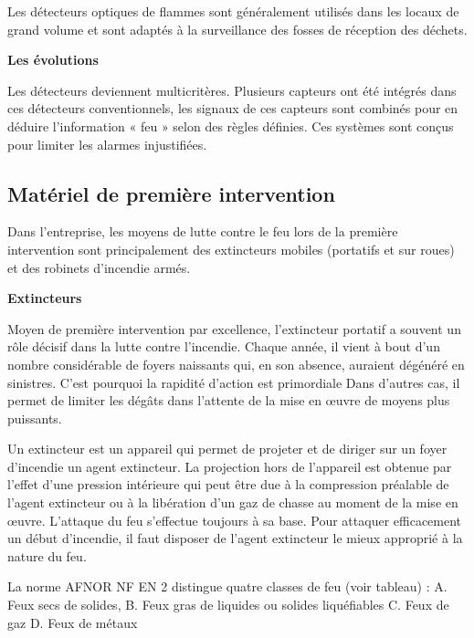 Les détecteurs optiques de flammes sont généralement utilisés dans les locaux de grand volume et sont adaptés à la surveillance des fosses de réception des déchets.


\vspace{0.3cm}
\textbf{Les évolutions}
\vspace{0.3cm} 

Les détecteurs deviennent multicritères. Plusieurs capteurs ont été intégrés dans ces détecteurs conventionnels, les signaux de ces capteurs sont combinés pour en déduire l’information « feu » selon des règles définies. Ces systèmes sont conçus pour limiter les alarmes injustifiées.


\subsection{Matériel de première intervention}

Dans l’entreprise, les moyens de lutte contre le feu lors de la première intervention sont principalement des extincteurs mobiles (portatifs et sur roues) et des robinets d’incendie armés.

\vspace{0.3cm}
\textbf{Extincteurs}
\vspace{0.3cm}


Moyen de première intervention par excellence, l’extincteur portatif a souvent un rôle décisif dans la lutte contre l’incendie. Chaque année, il vient à bout d’un nombre considérable de foyers naissants qui, en son absence, auraient dégénéré en sinistres. C’est pourquoi la rapidité d’action est primordiale 
Dans d’autres cas, il permet de limiter les dégâts dans l’attente de la mise en œuvre de moyens plus puissants.
\vspace{0.3cm}

Un extincteur est un appareil qui permet de projeter et de diriger sur un foyer d’incendie un agent extincteur. La projection hors de l’appareil est obtenue par l’effet d’une pression intérieure qui peut être due à la compression préalable de l’agent extincteur ou à la libération d’un gaz de chasse au moment de la mise en œuvre. L’attaque du feu s’effectue toujours à sa base.
Pour attaquer efficacement un début d’incendie, il faut disposer de l’agent extincteur le mieux approprié à la nature du feu.
\vspace{0.3cm}

La norme AFNOR NF EN 2 distingue quatre classes de feu (voir tableau) :
A. Feux secs de solides,
B. Feux gras de liquides ou solides liquéfiables
C. Feux de gaz
D. Feux de métaux

